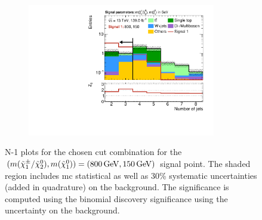 \begin{figure}
\begin{subfigure}[b]{0.5\linewidth}
	\end{subfigure}\hfill
	\begin{subfigure}[b]{0.5\linewidth}
		\centering\includegraphics[width=0.9\textwidth]{N-1_cut_scan/n1_800_150/nJet30}
	\end{subfigure}

	\caption[N-1 plots for the chosen cut combination for the (800, 150) signal point]{N-1 plots for the chosen cut combination for the $(m(\charg/\neutr), m(\lsp)) = (\SI{800}{\GeV}, \SI{150}{\GeV})$ signal point. The shaded region includes \gls{mc} statistical as well as 30\% systematic uncertainties (added in quadrature) on the background. The significance is computed using the binomial discovery significance using the uncertainty on the background.}
	\label{fig:results_n1_800_150}
\end{figure}

